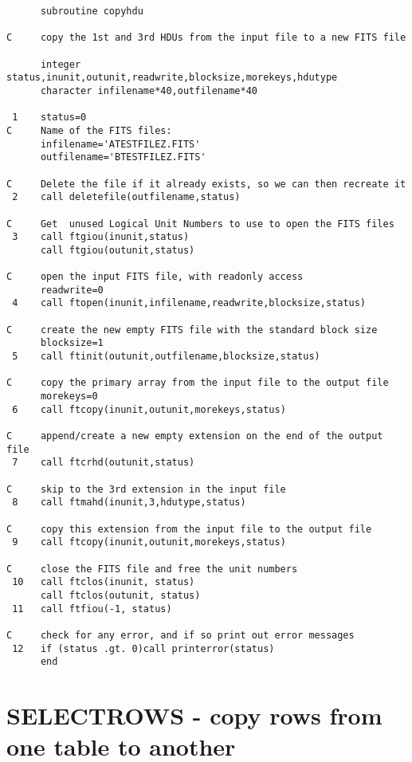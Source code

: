 \newpage
\small
\begin{verbatim}
      subroutine copyhdu

C     copy the 1st and 3rd HDUs from the input file to a new FITS file

      integer status,inunit,outunit,readwrite,blocksize,morekeys,hdutype
      character infilename*40,outfilename*40

 1    status=0
C     Name of the FITS files:
      infilename='ATESTFILEZ.FITS'
      outfilename='BTESTFILEZ.FITS'

C     Delete the file if it already exists, so we can then recreate it
 2    call deletefile(outfilename,status)

C     Get  unused Logical Unit Numbers to use to open the FITS files
 3    call ftgiou(inunit,status)
      call ftgiou(outunit,status)

C     open the input FITS file, with readonly access
      readwrite=0
 4    call ftopen(inunit,infilename,readwrite,blocksize,status)

C     create the new empty FITS file with the standard block size
      blocksize=1
 5    call ftinit(outunit,outfilename,blocksize,status)

C     copy the primary array from the input file to the output file
      morekeys=0
 6    call ftcopy(inunit,outunit,morekeys,status)

C     append/create a new empty extension on the end of the output file
 7    call ftcrhd(outunit,status)

C     skip to the 3rd extension in the input file
 8    call ftmahd(inunit,3,hdutype,status)

C     copy this extension from the input file to the output file
 9    call ftcopy(inunit,outunit,morekeys,status)  

C     close the FITS file and free the unit numbers
 10   call ftclos(inunit, status)
      call ftclos(outunit, status)
 11   call ftfiou(-1, status)

C     check for any error, and if so print out error messages
 12   if (status .gt. 0)call printerror(status)
      end
\end{verbatim}
\normalsize
\newpage
\section{SELECTROWS - copy rows from one table to another}

